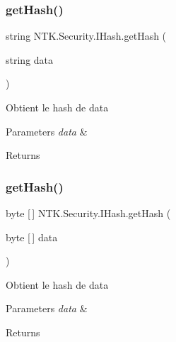 \subsubsection{\texorpdfstring{getHash()}{getHash()}\hspace{0.1cm}{\footnotesize\ttfamily [1/2]}}
{\footnotesize\ttfamily string N\+T\+K.\+Security.\+I\+Hash.\+get\+Hash (\begin{DoxyParamCaption}\item[{string}]{data }\end{DoxyParamCaption})}



Obtient le hash de data 


\begin{DoxyParams}{Parameters}
{\em data} & \\
\hline
\end{DoxyParams}
\begin{DoxyReturn}{Returns}

\end{DoxyReturn}
\mbox{\label{interface_n_t_k_1_1_security_1_1_i_hash_a7dee1d91baedafc8434b63f0c5461bfe}} 
\subsubsection{\texorpdfstring{getHash()}{getHash()}\hspace{0.1cm}{\footnotesize\ttfamily [2/2]}}
{\footnotesize\ttfamily byte \mbox{[}$\,$\mbox{]} N\+T\+K.\+Security.\+I\+Hash.\+get\+Hash (\begin{DoxyParamCaption}\item[{byte \mbox{[}$\,$\mbox{]}}]{data }\end{DoxyParamCaption})}



Obtient le hash de data 


\begin{DoxyParams}{Parameters}
{\em data} & \\
\hline
\end{DoxyParams}
\begin{DoxyReturn}{Returns}

\end{DoxyReturn}
\mbox{\label{interface_n_t_k_1_1_security_1_1_i_hash_a9858d52fe5afa1795618d6ba3dc13577}} 
